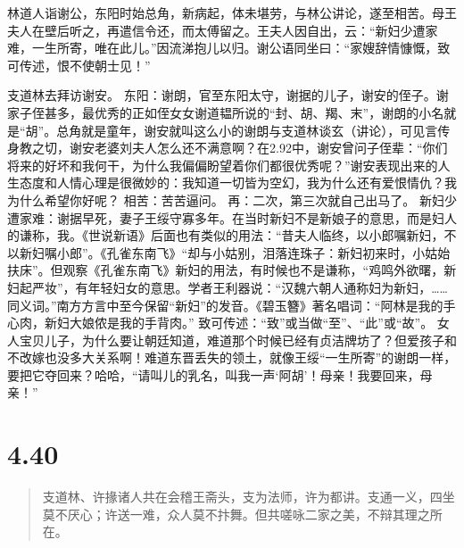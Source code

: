 \documentclass[]{book}
\begin{document}
林道人诣谢公，东阳时始总角，新病起，体未堪劳，与林公讲论，遂至相苦。母王夫人在壁后听之，再遣信令还，而太傅留之。王夫人因自出，云：``新妇少遭家难，一生所寄，唯在此儿。''因流涕抱儿以归。谢公语同坐曰：``家嫂辞情慷慨，致可传述，恨不使朝士见！''

支道林去拜访谢安。
东阳：谢朗，官至东阳太守，谢据的儿子，谢安的侄子。谢家子侄甚多，最优秀的正如侄女女谢道韫所说的``封、胡、羯、末''，谢朗的小名就是``胡''。总角就是童年，谢安就叫这么小的谢朗与支道林谈玄（讲论），可见言传身教之切，谢安老婆刘夫人怎么还不满意啊？在2.92中，谢安曾问子侄辈：``你们将来的好坏和我何干，为什么我偏偏盼望着你们都很优秀呢？''谢安表现出来的人生态度和人情心理是很微妙的：我知道一切皆为空幻，我为什么还有爱恨情仇？我为什么希望你好呢？
相苦：苦苦逼问。 再：二次，第三次就自己出马了。
新妇少遭家难：谢据早死，妻子王绥守寡多年。在当时新妇不是新娘子的意思，而是妇人的谦称，我。《世说新语》后面也有类似的用法：``昔夫人临终，以小郎嘱新妇，不以新妇嘱小郎''。《孔雀东南飞》``却与小姑别，泪落连珠子：新妇初来时，小姑始扶床''。但观察《孔雀东南飞》新妇的用法，有时候也不是谦称，``鸡鸣外欲曙，新妇起严妆''，有年轻妇女的意思。学者王利器说：``汉魏六朝人通称妇为新妇，\ldots{}\ldots{}同义词。''南方方言中至今保留``新妇''的发音。《碧玉簪》著名唱词：``阿林是我的手心肉，新妇大娘侬是我的手背肉。''
致可传述：``致''或当做``至''、``此''或``故''。
女人宝贝儿子，为什么要让朝廷知道，难道那个时候已经有贞洁牌坊了？但爱孩子和不改嫁也没多大关系啊！难道东晋丢失的领土，就像王绥``一生所寄''的谢朗一样，要把它夺回来？哈哈，``请叫儿的乳名，叫我一声`阿胡'！母亲！我要回来，母亲！''

\section{4.40}\label{section-218}

\begin{quote}
支道林、许掾诸人共在会稽王斋头，支为法师，许为都讲。支通一义，四坐莫不厌心；许送一难，众人莫不抃舞。但共嗟咏二家之美，不辩其理之所在。
\end{quote}
\end{document}
